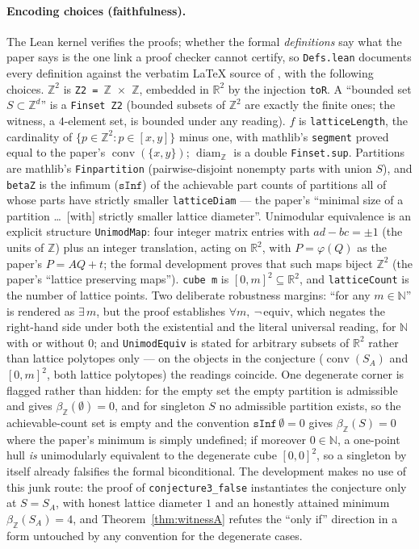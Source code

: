 \documentclass[11pt]{article}
\theoremstyle{remark}
\newcommand{\Z}{\mathbb{Z}}
\newcommand{\R}{\mathbb{R}}
\newcommand{\N}{\mathbb{N}}
\newcommand{\conv}{\operatorname{conv}}
\newcommand{\diamZ}{\operatorname{diam}_{\Z}}
\newcommand{\betaZ}{\beta_{\Z}}
\begin{document}
\paragraph{Encoding choices (faithfulness).}
The Lean kernel verifies the proofs; whether the formal \emph{definitions}
say what the paper says is the one link a proof checker cannot certify, so
\texttt{Defs.lean} documents every definition against the verbatim \LaTeX{}
source of \cite{BDLT2025}, with the following choices. $\Z^2$ is
\texttt{Z2 = $\mathbb{Z}$ $\times$ $\mathbb{Z}$}, embedded in
$\R^2$ by the injection \texttt{toR}. A ``bounded set $S \subset \Z^d$'' is
a \texttt{Finset Z2} (bounded subsets of $\Z^2$ are exactly the finite
ones; the witness, a $4$-element set, is bounded under any reading).
$f$ is \texttt{latticeLength}, the cardinality of
$\{p \in \Z^2 : p \in [x,y]\}$ minus one, with mathlib's \texttt{segment}
proved equal to the paper's $\conv(\{x,y\})$;
$\diamZ$ is a double \texttt{Finset.sup}. Partitions are mathlib's
\texttt{Finpartition} (pairwise-disjoint nonempty parts with union $S$), and
\texttt{betaZ} is the infimum ($\mathtt{sInf}$) of the achievable part
counts of partitions all of whose parts have strictly smaller
\texttt{latticeDiam} --- the paper's ``minimal size of a partition \dots\
[with] strictly smaller lattice diameter''. Unimodular equivalence is an
explicit structure \texttt{UnimodMap}: four integer matrix entries with
$ad - bc = \pm 1$ (the units of $\Z$) plus an integer translation, acting on
$\R^2$, with $P = \varphi(Q)$ as the paper's $P = AQ + t$; the formal
development proves that such maps biject $\Z^2$ (the paper's ``lattice
preserving maps''). \texttt{cube m} is $[0,m]^2 \subseteq \R^2$, and
\texttt{latticeCount} is the number of lattice points. Two deliberate
robustness margins: ``for any $m \in \N$'' is rendered as
$\exists\, m$, but the proof establishes $\forall m,\ \neg\,\mathrm{equiv}$,
which negates the right-hand side under both the existential and the literal
universal reading, for $\N$ with or without $0$; and \texttt{UnimodEquiv} is
stated for arbitrary subsets of $\R^2$ rather than lattice polytopes only ---
on the objects in the conjecture ($\conv(S_A)$ and $[0,m]^2$, both lattice
polytopes) the readings coincide. One degenerate corner is flagged rather
than hidden: for the empty set the empty partition is admissible and gives
$\betaZ(\emptyset) = 0$, and for singleton $S$ no admissible partition
exists, so the achievable-count set is empty and the convention
$\mathtt{sInf}\,\emptyset = 0$ gives $\betaZ(S) = 0$ where the paper's
minimum is simply undefined; if moreover $0 \in \N$, a one-point hull
\emph{is} unimodularly equivalent to the degenerate cube $[0,0]^2$, so a
singleton by itself already falsifies the formal biconditional. The
development makes no use of this junk route: the proof of
\texttt{conjecture3\_false} instantiates the conjecture only at $S = S_A$,
with honest lattice diameter $1$ and an honestly attained minimum
$\betaZ(S_A) = 4$, and Theorem~\ref{thm:witnessA} refutes the ``only if''
direction in a form untouched by any convention for the degenerate cases.
\end{document}
